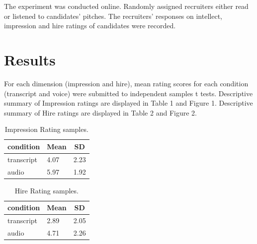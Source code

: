 \documentclass[
  english,
  man]{apa6}
\begin{document}
The experiment was conducted online. Randomly assigned recruiters either read or listened to candidates' pitches. The recruiters' responses on intellect, impression and hire ratings of candidates were recorded.

\hypertarget{results}{%
\section{Results}\label{results}}

For each dimension (impression and hire), mean rating scores for each condition (transcript and voice) were submitted to independent samples t tests. Descriptive summary of Impression ratings are displayed in Table 1 and Figure 1. Descriptive summary of Hire ratings are displayed in Table 2 and Figure 2.

\begin{table}[tbp]

\begin{center}
\begin{threeparttable}

\caption{\label{tab:unnamed-chunk-2}Impression Rating samples.}

\begin{tabular}{lll}
\toprule
condition & \multicolumn{1}{c}{Mean} & \multicolumn{1}{c}{SD}\\
\midrule
transcript & 4.07 & 2.23\\
audio & 5.97 & 1.92\\
\bottomrule
\end{tabular}

\end{threeparttable}
\end{center}

\end{table}

\begin{table}[tbp]

\begin{center}
\begin{threeparttable}

\caption{\label{tab:unnamed-chunk-2}Hire Rating samples.}

\begin{tabular}{lll}
\toprule
condition & \multicolumn{1}{c}{Mean} & \multicolumn{1}{c}{SD}\\
\midrule
transcript & 2.89 & 2.05\\
audio & 4.71 & 2.26\\
\bottomrule
\end{tabular}

\end{threeparttable}
\end{center}

\end{table}
\end{document}
